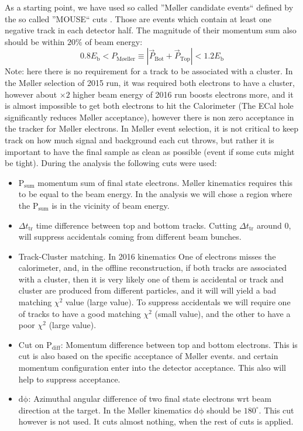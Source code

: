 \documentclass[letterpaper,12pt]{article}
\def \Mlr {M\o ller }
\begin{document}
As a starting point, we have used so called ''\Mlr candidate events`` defined by the so called ''MOUSE`` cuts \cite{MOUSE_Cuts}. Those are events which contain at least one negative track in each detector half. The magnitude of their momentum sum also should be within $\mathrm{20\%}$ of beam energy:
\begin{equation}
 0.8E_{\mathrm{b}} < P_{\mathrm{M\text{\o} eller}} \equiv |\vec{P}_{\mathrm{Bot}} + \vec{P}_{\mathrm{Top}}| < 1.2E_{\mathrm{b}}
\end{equation}
Note: here there is no requirement for a track to be associated with a cluster. In the \Mlr selection of 2015 run, it was required both electrons to have a cluster, however about $\times 2$ higher beam energy of 2016 run boosts electrons more, and it is almost impossible to get both electrons to hit the Calorimeter (The ECal hole significantly reduces \Mlr acceptance), however there is non zero acceptance in the tracker for \Mlr electrons.
In \Mlr event selection, it is not critical to keep track on how much signal and background each cut throws, but rather it is important to have the final sample as clean as possible (event if some cuts might be tight). During the analysis the following cuts were used:
\begin{itemize}
 \item $\mathrm{P_{sum}}$ momentum sum of final state electrons. \Mlr kinematics requires this to be equal to the beam energy. In the analysis we will chose a region where the  $\mathrm{P_{sum}}$ is in the vicinity of beam energy.
 \item $\Delta t_{\mathrm{tr}}$ time difference between top and bottom tracks. Cutting $\Delta t_{\mathrm{tr}}$ around 0, will suppress accidentals coming from different beam bunches.
 \item Track-Cluster matching. In 2016 kinematics One of electrons misses the calorimeter, and, in the offline reconstruction, if both tracks are associated with a cluster, then it is very likely one of them is accidental or track and cluster are produced from different particles, and it will will yield a bad matching $\chi^{2}$ value (large value). To suppress accidentals we will require one of tracks to have a good matching $\chi^{2}$ (small value), and the other to have a poor $\chi^{2}$ (large value).
 \item Cut on $\mathrm{P_{diff}}$: Momentum difference between top and bottom electrons.
 This is cut is also based on the specific acceptance of \Mlr events. and certain momentum configuration enter into the detector acceptance. This also will help to suppress acceptance.
 \item $\mathrm{d\phi}$: Azimuthal angular difference of two final state electrons wrt beam direction at the target. In the \Mlr kinematics $\mathrm{d\phi}$ should be $180^{\circ}$. This cut however is not used. It cuts almost nothing, when the rest of cuts is applied.
\end{itemize}
\end{document}
